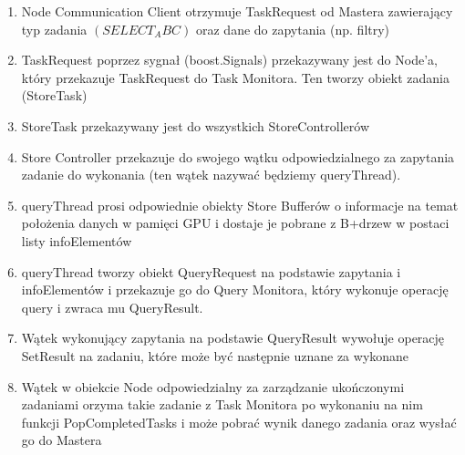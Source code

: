 \documentclass[paper=a4, fontsize=11pt]{scrartcl} %
\numberwithin{equation}{section} %
\numberwithin{figure}{section} %
\numberwithin{table}{section} %
\begin{document}
		\begin{enumerate}
			\item Node Communication Client otrzymuje TaskRequest od Mastera zawierający typ zadania $(SELECT_ABC)$ oraz dane do zapytania (np. filtry)
			\item TaskRequest poprzez sygnał (boost.Signals) przekazywany jest do Node'a, który przekazuje TaskRequest do Task Monitora. Ten tworzy 
				obiekt zadania (StoreTask)
			\item StoreTask przekazywany jest do wszystkich StoreControllerów
			\item Store Controller przekazuje do swojego wątku odpowiedzialnego za zapytania zadanie do wykonania (ten wątek nazywać będziemy queryThread). 
			\item queryThread prosi odpowiednie obiekty Store Bufferów o informacje na temat położenia danych w pamięci GPU i dostaje je pobrane z B+drzew w postaci listy infoElementów
			\item queryThread tworzy obiekt QueryRequest na podstawie zapytania i infoElementów i przekazuje go do Query Monitora, który wykonuje operację query i zwraca mu QueryResult. 
			\item Wątek wykonujący zapytania na podstawie QueryResult wywołuje operację SetResult na zadaniu, które może być następnie uznane za wykonane
			\item Wątek w obiekcie Node odpowiedzialny za zarządzanie ukończonymi zadaniami orzyma takie zadanie z Task Monitora po wykonaniu na nim funkcji PopCompletedTasks
				i może pobrać wynik danego zadania oraz wysłać go do Mastera 
		\end{enumerate}
\end{document}
